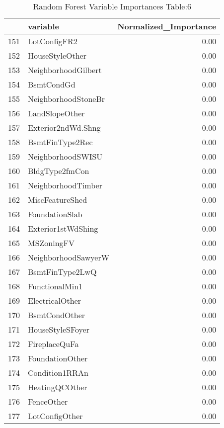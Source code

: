 \begin{table}[ht]
\centering
\begin{tabular}{rlr}
  \hline
 & variable & Normalized\_Importance \\ 
  \hline
151 & LotConfigFR2 & 0.00 \\ 
  152 & HouseStyleOther & 0.00 \\ 
  153 & NeighborhoodGilbert & 0.00 \\ 
  154 & BsmtCondGd & 0.00 \\ 
  155 & NeighborhoodStoneBr & 0.00 \\ 
  156 & LandSlopeOther & 0.00 \\ 
  157 & Exterior2ndWd.Shng & 0.00 \\ 
  158 & BsmtFinType2Rec & 0.00 \\ 
  159 & NeighborhoodSWISU & 0.00 \\ 
  160 & BldgType2fmCon & 0.00 \\ 
  161 & NeighborhoodTimber & 0.00 \\ 
  162 & MiscFeatureShed & 0.00 \\ 
  163 & FoundationSlab & 0.00 \\ 
  164 & Exterior1stWdShing & 0.00 \\ 
  165 & MSZoningFV & 0.00 \\ 
  166 & NeighborhoodSawyerW & 0.00 \\ 
  167 & BsmtFinType2LwQ & 0.00 \\ 
  168 & FunctionalMin1 & 0.00 \\ 
  169 & ElectricalOther & 0.00 \\ 
  170 & BsmtCondOther & 0.00 \\ 
  171 & HouseStyleSFoyer & 0.00 \\ 
  172 & FireplaceQuFa & 0.00 \\ 
  173 & FoundationOther & 0.00 \\ 
  174 & Condition1RRAn & 0.00 \\ 
  175 & HeatingQCOther & 0.00 \\ 
  176 & FenceOther & 0.00 \\ 
  177 & LotConfigOther & 0.00 \\ 
   \hline
\end{tabular}
\caption{Random Forest Variable Importances Table:6} 
\label{tab:importance6}
\end{table}

